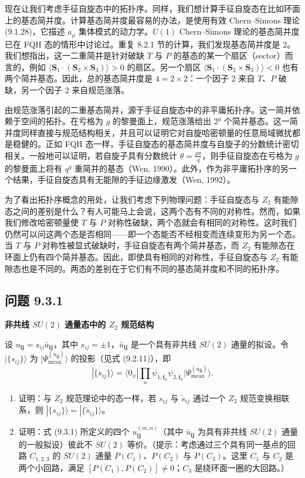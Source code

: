 现在让我们考虑手征自旋态中的拓扑序。同样，我们想计算手征自旋态在比如环面上的基态简并度。计算基态简并度最容易的办法，是使用有效 Chern--Simons 理论 (9.1.28)，它描述 $a_{\mu}$ 集体模式的动力学。$U(1)$ Chern--Simons 理论的基态简并度已在 FQH 态的情形中讨论过。重复 8.2.1 节的计算，我们发现基态简并度是 2。我们想指出，这一二重简并是针对破缺 $T$ 与 $P$ 的基态的某一个扇区（sector）而言的，例如 $\langle\pmb{S}_1\cdot(\pmb{S}_2\times\pmb{S}_3)\rangle>0$ 的扇区。另一个扇区 $\langle\pmb{S}_1\cdot(\pmb{S}_2\times\pmb{S}_3)\rangle<0$ 也有两个简并基态。因此，总的基态简并度是 $4=2\times2$：一个因子 2 来自 $T$、$P$ 破缺，另一个因子 2 来自规范涨落。

由规范涨落引起的二重基态简并，源于手征自旋态中的非平庸拓扑序。这一简并依赖于空间的拓扑。在亏格为 $g$ 的黎曼面上，规范涨落给出 $2^g$ 个简并基态。这一简并度同样直接与规范结构相关，并且可以证明它对自旋哈密顿量的任意局域微扰都是稳健的。正如 FQH 态一样，手征自旋态的基态简并度与自旋子的分数统计密切相关。一般地可以证明，若自旋子具有分数统计 $\theta=\frac{p\pi}{q}$，则手征自旋态在亏格为 $g$ 的黎曼面上将有 $q^g$ 重简并的基态（Wen, 1990）。此外，作为非平庸拓扑序的另一个结果，手征自旋态具有无能隙的手征边缘激发（Wen, 1992）。

为了看出拓扑序概念的用处，让我们考虑下列物理问题：手征自旋态与 $Z_2$ 有能隙态之间的差别是什么？有人可能马上会说，这两个态有不同的对称性。然而，如果我们修改哈密顿量使 $T$ 与 $P$ 对称性破缺，两个态就会有相同的对称性。这时我们仍然可以问这两个态是否相同——即一个态能否不经相变而连续变形为另一个态。当 $T$ 与 $P$ 对称性被显式破缺时，手征自旋态有两个简并基态，而 $Z_2$ 有能隙态在环面上仍有四个简并基态。因此，即使具有相同的对称性，手征自旋态与 $Z_2$ 有能隙态也是不同的。两态的差别在于它们有不同的基态简并度和不同的拓扑序。

\subsection*{问题 9.3.1}

\textbf{非共线 $SU(2)$ 通量态中的 $Z_2$ 规范结构}

设 $u_{\pmb{ij}}=s_{ij}\bar{u}_{\pmb{ij}}$，其中 $s_{ij}=\pm1$，$\bar{u}_{\pmb{ij}}$ 是一个具有非共线 $SU(2)$ 通量的拟设。令 $|\{s_{ij}\}\rangle$ 为 $|\Psi_{\text{mean}}^{(u_{\pmb{ij}})}\rangle$ 的投影（见式 (9.2.11)），即
\begin{equation*}
|\{s_{ij}\}\rangle=\langle0_{\psi}|\prod_n\psi_{1,\pmb{i}_n}\psi_{2,\pmb{i}_n}|\Psi_{\text{mean}}^{(u_{\pmb{ij}})}\rangle.
\end{equation*}
\begin{enumerate}[label=(\alph*)]
\item 证明：与 $Z_2$ 规范理论中的态一样，若 $s_{ij}$ 与 $\tilde{s}_{ij}$ 通过一个 $Z_2$ 规范变换相联系，则 $|\{s_{ij}\}\rangle=|\{\tilde{s}_{ij}\}\rangle$。
\item 证明：式 (9.3.1) 所定义的四个 $u_{\pmb{ij}}^{(m,n)}$（其中 $\bar{u}_{\pmb{ij}}$ 为具有非共线 $SU(2)$ 通量的一般拟设）彼此不 $SU(2)$ 等价。（提示：考虑通过三个具有同一基点的回路 $C_{1,2,3}$ 的 $SU(2)$ 通量 $P(C_1)$、$P(C_2)$ 与 $P(C_3)$。这里 $C_1$ 与 $C_2$ 是两个小回路，满足 $[P(C_1),P(C_2)]\neq0$；$C_3$ 是绕环面一圈的大回路。）
\end{enumerate}


